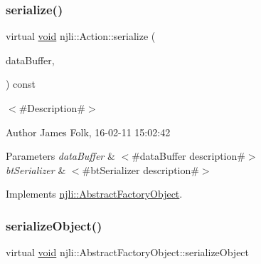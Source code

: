 \mbox{\label{classnjli_1_1_action_a12e735927e2340525708f522d8daff88}} 
\subsubsection{\texorpdfstring{serialize()}{serialize()}}
{\footnotesize\ttfamily virtual \mbox{\hyperlink{_thread_8h_af1e856da2e658414cb2456cb6f7ebc66}{void}} njli\+::\+Action\+::serialize (\begin{DoxyParamCaption}\item[{\mbox{\hyperlink{_thread_8h_af1e856da2e658414cb2456cb6f7ebc66}{void}} $\ast$}]{data\+Buffer,  }\item[{bt\+Serializer $\ast$}]{ }\end{DoxyParamCaption}) const\hspace{0.3cm}{\ttfamily [virtual]}}



$<$\#\+Description\#$>$ 

\begin{DoxyAuthor}{Author}
James Folk, 16-\/02-\/11 15\+:02\+:42
\end{DoxyAuthor}

\begin{DoxyParams}{Parameters}
{\em data\+Buffer} & $<$\#data\+Buffer description\#$>$ \\
\hline
{\em bt\+Serializer} & $<$\#bt\+Serializer description\#$>$ \\
\hline
\end{DoxyParams}


Implements \mbox{\hyperlink{classnjli_1_1_abstract_factory_object_aad2fbe86fb3bdecf02918a96b9c57976}{njli\+::\+Abstract\+Factory\+Object}}.

\mbox{\label{classnjli_1_1_action_a4fc4bcd9d1930911474210c047372fc0}} 
\subsubsection{\texorpdfstring{serialize\+Object()}{serializeObject()}}
{\footnotesize\ttfamily virtual \mbox{\hyperlink{_thread_8h_af1e856da2e658414cb2456cb6f7ebc66}{void}} njli\+::\+Abstract\+Factory\+Object\+::serialize\+Object}

